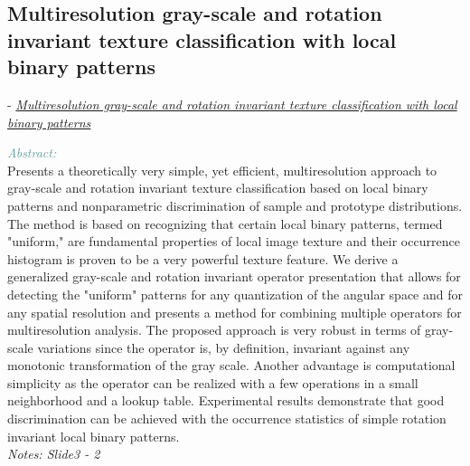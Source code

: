 \documentclass[]{article}
\newcommand{\paperentry}[4]{
            \hangindent=1cm
            \cite{#1} - \href{run:../References/#3}{\textcolor{Sepia}{\textit{#2}}}
            
            \noindent            
            \begin{minipage}[t]{0.1\linewidth}\hfill\end{minipage}
            \begin{minipage}[t]{0.8\linewidth}\textcolor{CadetBlue}{{\textit{Abstract:}}}\\#4\end{minipage}
            \vspace{.25cm}
          }
\begin{document}
\subsection{Multiresolution gray-scale and rotation invariant texture classification with local binary patterns} 			
 			\paperentry{Ojala2002lbp}
 			{Multiresolution gray-scale and rotation invariant texture classification with local binary patterns}
 			{Existing Histogram Layers/lbp.pdf}
 			{Presents a theoretically very simple, yet efficient, multiresolution approach to gray-scale and rotation invariant texture classification based on local binary patterns and nonparametric discrimination of sample and prototype distributions. The method is based on recognizing that certain local binary patterns, termed "uniform," are fundamental properties of local image texture and their occurrence histogram is proven to be a very powerful texture feature. We derive a generalized gray-scale and rotation invariant operator presentation that allows for detecting the "uniform" patterns for any quantization of the angular space and for any spatial resolution and presents a method for combining multiple operators for multiresolution analysis. The proposed approach is very robust in terms of gray-scale variations since the operator is, by definition, invariant against any monotonic transformation of the gray scale. Another advantage is computational simplicity as the operator can be realized with a few operations in a small neighborhood and a lookup table. Experimental results demonstrate that good discrimination can be achieved with the occurrence statistics of simple rotation invariant local binary patterns.
 				\\\emph{Notes: Slide3 - 2}} \\ 
 			
\pagebreak
 			
\end{document}
